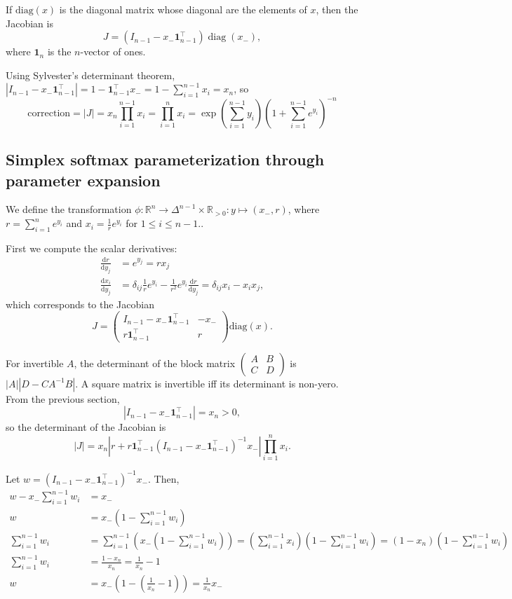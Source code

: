 \documentclass[11pt]{article}
\begin{document}
If $\mathrm{diag}(x)$ is the diagonal matrix whose diagonal are the
elements of $x$, then the Jacobian is
\[
  J = (I_{n-1} - x_- \boldsymbol{1}_{n-1}^\top) \operatorname{diag}(x_-),
\]
where $\boldsymbol{1}_n$ is the $n$-vector of ones.

Using Sylvester's determinant theorem,
$|I_{n-1} - x_- \boldsymbol{1}_{n-1}^\top| = 1 -
\boldsymbol{1}_{n-1}^\top x_- = 1 - \sum_{i=1}^{n-1} x_i = x_n$, so
$$\mathrm{correction} = |J| = x_n \prod_{i=1}^{n-1} x_i = \prod_{i=1}^{n} x_i = \exp\left(\sum_{i=1}^{n-1} y_i\right) \left(1 + \sum_{i=1}^{n-1} e^{y_i}\right)^{-n}$$


\subsection{Simplex softmax parameterization through parameter expansion}

We define the transformation
$\phi: \mathbb{R}^n \to \Delta^{n-1} \times \mathbb{R}_{>0}: y \mapsto
(x_-, r)$, where $r = \sum_{i=1}^n e^{y_i}$ and
$x_i = \frac{1}{r} e^{y_i}$ for $1 \le i \le n-1$..

First we compute the scalar derivatives:
\[
\begin{aligned}
  \frac{\mathrm{d} r}{\mathrm{d} y_j}
  &= e^{y_j} = r x_j
  \\
  \frac{\mathrm{d} x_i}{\mathrm{d} y_j}
  &= \delta_{ij} \frac{1}{r} e^{y_i} - \frac{1}{r^2} e^{y_i} \frac{\mathrm{d} r}{\mathrm{d} y_j} = \delta_{ij} x_i - x_i x_j,
\end{aligned}
\]
which corresponds to the Jacobian
\[
  J = \begin{pmatrix}I_{n-1} - x_- \boldsymbol{1}_{n-1}^\top & -x_- \\
    r \boldsymbol{1}_{n-1}^\top & r \end{pmatrix} \mathrm{diag}(x).
\]

For invertible $A$, the determinant of the block matrix
$\begin{pmatrix}A & B \\ C & D\end{pmatrix}$ is $|A| |D-CA^{-1}B|$.  A
square matrix is invertible iff its determinant is non-yero.  From the
previous section,
\[
  |I_{n-1} - x_- \boldsymbol{1}_{n-1}^\top| = x_n > 0,
\]
so the determinant of the Jacobian is
\[
  |J| = x_n \left|r + r \boldsymbol{1}_{n-1}^\top (I_{n-1} - x_-
    \boldsymbol{1}_{n-1}^\top)^{-1} x_-\right|
  \prod_{i=1}^n x_i.
\]

Let $w = (I_{n-1} - x_- \boldsymbol{1}_{n-1}^\top)^{-1} x_-$. Then,
\[
\begin{aligned}
    w - x_- \sum_{i=1}^{n-1} w_i &= x_-\\
    w &= x_- \left(1 - \sum_{i=1}^{n-1} w_i\right)\\
    \sum_{i=1}^{n-1} w_i &= \sum_{i=1}^{n-1} \left( x_- (1 - \sum_{i=1}^{n-1} w_i) \right) = \left(\sum_{i=1}^{n-1} x_i \right) \left(1 - \sum_{i=1}^{n-1} w_i\right) = (1 - x_n)  \left(1 - \sum_{i=1}^{n-1} w_i\right)\\
    \sum_{i=1}^{n-1} w_i &= \frac{1 - x_n}{x_n} = \frac{1}{x_n} - 1\\
    w &= x_- \left(1 - \left(\frac{1}{x_n} - 1\right)\right) = \frac{1}{x_n} x_-
  \end{aligned}
\]
\end{document}
